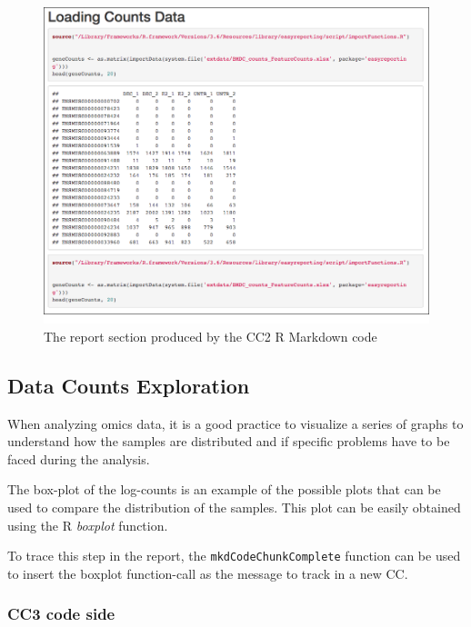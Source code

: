 \documentclass[]{article}
\begin{document}
\begin{figure}[ht]

{\centering \includegraphics[width=0.95\linewidth]{imgs/21} 

}

\caption{The report section produced by the CC2 R Markdown code}\label{fig:unnamed-chunk-6}
\end{figure}

\hypertarget{data-counts-exploration}{%
\subsection{Data Counts Exploration}\label{data-counts-exploration}}

When analyzing omics data, it is a good practice to visualize a series
of graphs to understand how the samples are distributed and if specific
problems have to be faced during the analysis.

The box-plot of the log-counts is an example of the possible plots that
can be used to compare the distribution of the samples. This plot can be
easily obtained using the R \emph{boxplot} function.

To trace this step in the report, the \texttt{mkdCodeChunkComplete}
function can be used to insert the boxplot function-call as the message
to track in a new CC.

\hypertarget{cc3-code-side}{%
\subsubsection{CC3 code side}\label{cc3-code-side}}
\end{document}
